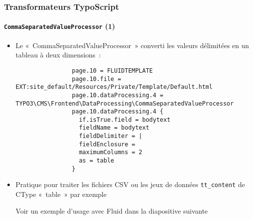 \begin{frame}[fragile]
	\frametitle{Transformateurs TypoScript}
	\framesubtitle{\texttt{CommaSeparatedValueProcessor} (1)}

	\lstset{basicstyle=\tiny\ttfamily}

	\begin{itemize}

		\item Le «~CommaSeparatedValueProcessor~» converti les valeurs délimitées en un tableau à deux dimensions~:

			\begin{lstlisting}
				page.10 = FLUIDTEMPLATE
				page.10.file = EXT:site_default/Resources/Private/Template/Default.html
				page.10.dataProcessing.4 = TYPO3\CMS\Frontend\DataProcessing\CommaSeparatedValueProcessor
				page.10.dataProcessing.4 {
				  if.isTrue.field = bodytext
				  fieldName = bodytext
				  fieldDelimiter = |
				  fieldEnclosure =
				  maximumColumns = 2
				  as = table
				}
			\end{lstlisting}

		\item Pratique pour traiter les fichiers CSV ou les jeux de données \texttt{tt\_content} de CType «~table~» par exemple

			\vspace{0.2cm}
			\small
				Voir un exemple d'usage avec Fluid dans la diapositive suivante
			\normalsize

	\end{itemize}

\end{frame}


